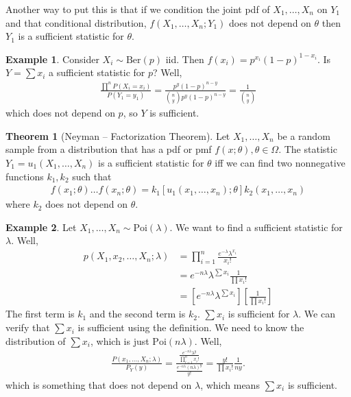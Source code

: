 \documentclass{book}
\theoremstyle{definition}
\newtheorem{thm}{Theorem}[section]
\newtheorem{exmp}{Example}[section]
\newcommand{\nn}{\nonumber}
\newcommand{\f}[2]{\frac{#1}{#2}}
\newcommand{\lb}{\left[}
\newcommand{\rb}{\right]}
\begin{document}
Another way to put this is that if we condition the joint pdf of $X_1,\dots,X_n$ on $Y_1$ and that conditional distribution, $f(X_1,\dots,X_n ; Y_1)$ does not depend on $\theta$ then $Y_1$ is a sufficient statistic for $\theta$. 



\begin{exmp}
	Consider $X_i \sim \mbox{Ber}(p)$ iid. Then $f(x_i) = p^{x_i}(1-p)^{1-x_i}$. Is $Y = \sum x_i$ a sufficient statistic for $p$? Well,
	\begin{align}
	\f{\prod^n P(X_i = x_i)}{P(Y_1 = y_1)} = \f{p^y (1-p)^{n-y}}{{{n}\choose{y}}p^y (1-p)^{n-y} } = \f{1}{{{n}\choose{y}}}
	\end{align}
	which does not depend on $p$, so $Y$ is sufficient. 
\end{exmp}







\begin{thm}[Neyman -- Factorization Theorem]
	Let $X_1,\dots,X_n$ be a random sample from a distribution that has a pdf or pmf $f(x;\theta), \theta \in \Omega$. The statistic $Y_1 = u_1(X_1,\dots,X_n)$ is a sufficient statistic for $\theta$ iff we can find two nonnegative functions $k_1,k_2$ such that 
	\begin{align*}
	f(x_1;\theta) \dots f(x_n; \theta) = k_1[u_1(x_1,\dots,x_n);\theta] k_2(x_1,\dots,x_n)
	\end{align*} 
	where $k_2$ does not depend on $\theta$. 
\end{thm}



\begin{exmp}
	Let $X_1,\dots,X_n \sim \mbox{Poi}(\lambda)$. We want to find a sufficient statistic for $\lambda$. Well,
	\begin{align}
	p(X_1,x_2,\dots,X_n ; \lambda) &= \prod^n_{i=1}\f{e^{-\lambda} \lambda^{x_i}}{x_i!}\nn\\
	&= e^{-n\lambda}\lambda^{\sum x_i}\f{1}{\prod x_i!}\nn\\
	&= \lb e^{-n\lambda} \lambda^{\sum x_i} \rb \lb \f{1}{\prod x_i!} \rb
	\end{align}
	The first term is $k_1$ and the second term is $k_2$. $\sum x_i$ is sufficient for $\lambda$. We can verify that $\sum x_i$ is sufficient using the definition. We need to know the distribution of $\sum x_i$, which is just $\mbox{Poi}(n\lambda)$. Well,
	\begin{align}
	\f{P(x_1,\dots,X_n ; \lambda)}{P_Y(y)} = \f{\f{e^{-n\lambda} \lambda^y}{\prod^n_{i=1}x_i!}}{\f{e^{-n\lambda}(n\lambda)^y}{y!}} = \f{y!}{\prod x_i!}\f{1}{ny}.
	\end{align}
	which is something that does not depend on $\lambda$, which means $\sum x_i$ is sufficient. 
\end{exmp}
\end{document}
